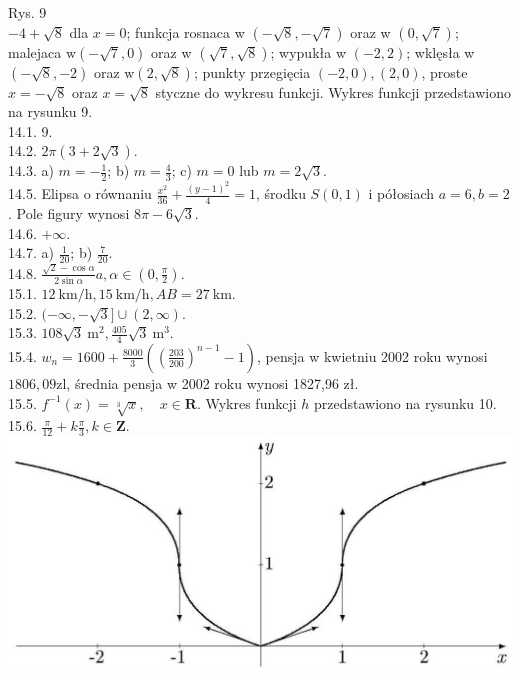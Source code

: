 \documentclass[10pt]{article}
\begin{document}
Rys. 9\\
$-4+\sqrt{8}$ dla $x=0$; funkcja rosnaca w $(-\sqrt{8},-\sqrt{7})$ oraz w $(0, \sqrt{7})$; malejaca $\mathrm{w}(-\sqrt{7}, 0)$ oraz w $(\sqrt{7}, \sqrt{8})$; wypukła w $(-2,2)$; wklęsła w $(-\sqrt{8},-2)$ oraz $\mathrm{w}(2, \sqrt{8})$; punkty przegięcia $(-2,0),(2,0)$, proste $x=-\sqrt{8}$ oraz $x=\sqrt{8}$ styczne do wykresu funkcji. Wykres funkcji przedstawiono na rysunku 9.\\
14.1. 9.\\
14.2. $2 \pi(3+2 \sqrt{3})$.\\
14.3. a) $m=-\frac{1}{2}$; b) $m=\frac{4}{3}$; c) $m=0$ lub $m=2 \sqrt{3}$.\\
14.5. Elipsa o równaniu $\frac{x^{2}}{36}+\frac{(y-1)^{2}}{4}=1$, środku $S(0,1)$ i półosiach $a=6, b=2$. Pole figury wynosi $8 \pi-6 \sqrt{3}$.\\
14.6. $+\infty$.\\
14.7. a) $\frac{1}{20}$; b) $\frac{7}{20}$.\\
14.8. $\frac{\sqrt{2}-\cos \alpha}{2 \sin \alpha} a, \alpha \in\left(0, \frac{\pi}{2}\right)$.\\
15.1. $12 \mathrm{~km} / \mathrm{h}, 15 \mathrm{~km} / \mathrm{h}, A B=27 \mathrm{~km}$.\\
15.2. $(-\infty,-\sqrt{3}] \cup(2, \infty)$.\\
15.3. $108 \sqrt{3} \mathrm{~m}^{2}, \frac{405}{4} \sqrt{3} \mathrm{~m}^{3}$.\\
15.4. $w_{n}=1600+\frac{8000}{3}\left(\left(\frac{203}{200}\right)^{n-1}-1\right)$, pensja w kwietniu 2002 roku wynosi $1806,09 \mathrm{zl}$, średnia pensja w 2002 roku wynosi 1827,96 zł.\\
15.5. $f^{-1}(x)=\sqrt[3]{x}, \quad x \in \mathbf{R}$. Wykres funkcji $h$ przedstawiono na rysunku 10.\\
15.6. $\frac{\pi}{12}+k \frac{\pi}{3}, k \in \mathbf{Z}$.\\
\includegraphics[max width=\textwidth, center]{2024_11_16_fe5b564401bf7db98894g-064(1)}
\end{document}
